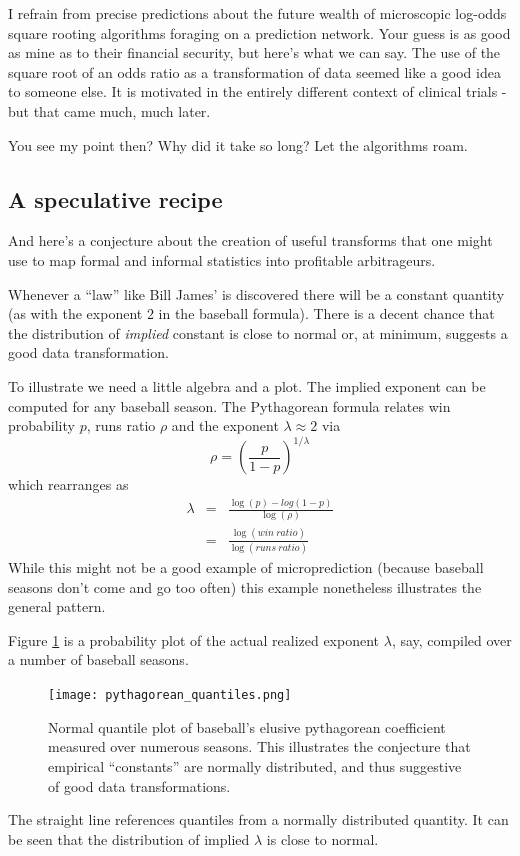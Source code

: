I refrain from precise predictions about the future wealth of microscopic log-odds square rooting algorithms foraging on a prediction network. Your guess is as good as mine as to their financial security, but here's what we can say. The use of the square root of an odds ratio as a transformation of data seemed like a good idea to someone else. It is motivated in the entirely different context of clinical trials - but that came much, much later. 

You see my point then? Why did it take so long? Let the algorithms roam. 

\subsection{A speculative recipe}

And here's a conjecture about the creation of useful transforms that one might use to map formal and informal statistics into profitable arbitrageurs.  

Whenever a ``law'' like Bill James' is discovered there will be a constant quantity (as with the exponent $2$ in the baseball formula). There is a decent chance that the distribution of {\em implied} constant is close to normal or, at minimum, suggests a good data transformation.  

To illustrate we need a little algebra and a plot. The implied exponent can be computed for any baseball season. The Pythagorean formula relates win probability $p$, runs ratio $\rho$ and the exponent $\lambda \approx 2$ via
$$\rho= \left( \frac{p}{1-p} \right)^{1/\lambda}
$$ 
which rearranges as
\begin{eqnarray*}
   \lambda & = & \frac{\log(p) - log(1-p)}{ \log( \rho ) } \\
       & = & \frac{\log(win\ ratio)}
                 {\log(runs\ ratio )}
\end{eqnarray*} While this might not be a good example of microprediction (because baseball seasons don't come and go too often) this example nonetheless illustrates the general pattern. 

Figure \ref{fig:lambdas} is a probability plot of the actual realized exponent $\lambda$, say, compiled over a number of baseball seasons.
\begin{figure}
	\begin{center}
		\texttt{[image: pythagorean\_quantiles.png]}
	\end{center}
	\caption{Normal quantile plot of baseball's elusive pythagorean coefficient measured over numerous seasons. This illustrates the conjecture that empirical ``constants'' are normally distributed, and thus suggestive of good data transformations.}
\label{fig:lambdas}
\end{figure}
The straight line references quantiles from a normally distributed quantity. It can be seen that the distribution of implied $\lambda$ is close to normal. 

